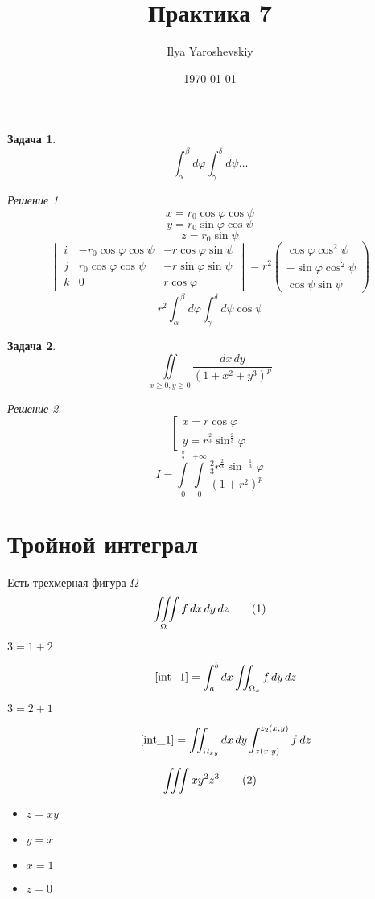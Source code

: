 \documentclass[english]{article}
\author{Ilya Yaroshevskiy}
\date{\today}
\title{Практика 7}
\newcommand\addtag{\refstepcounter{equation}\tag{\theequation}}
\theoremstyle{plain}
\theoremstyle{remark}
\newtheorem*{solution}{Решение}
\theoremstyle{definition}
\newtheorem{task}{Задача}
\begin{document}
\maketitle
\tableofcontents

\begin{task}
\[ \int_\alpha^\beta d\varphi \int_\gamma^\delta d\psi \dots \]
\end{task}
\begin{solution}
\[ x = r_0 \cos\varphi\cos\psi \]
\[ y = r_0 \sin\varphi\cos\psi \]
\[ z = r_0 \sin\psi \]
\[ \begin{vmatrix}
i & -r_0 \cos \varphi \cos \psi & - r \cos\varphi\sin\psi \\
j & r_0 \cos\varphi \cos \psi & - r\sin\varphi\sin\psi \\
k & 0 & r\cos\varphi
\end{vmatrix} = r^2 \begin{pmatrix}
\cos \varphi \cos^2 \psi \\
-\sin\varphi\cos^2\psi \\
\cos\psi\sin\psi
\end{pmatrix} \]
\[ r^2 \int^\beta_\alpha d\varphi \int_\gamma^\delta d\psi \cos\psi \]
\end{solution}

\begin{task}
\[ \iint\limits_{x\ge0,y\ge0} \frac{dx\,dy}{(1 + x^2 + y^3)^p} \]
\end{task}
\begin{solution}
\[ \left[\begin{array}{l}
x = r \cos\varphi \\
y = r^{\frac{2}{3}}\sin^{\frac{2}{3}}\varphi
\end{array}\right. \]
\[ I = \int\limits_0^{\frac{\pi}{2}}\int\limits_0^{ + \infty} \frac{\frac{2}{3} r^{\frac{2}{3}} \sin^{-\frac{1}{3}}\varphi}{(1 + r^2)^p}  \]
\end{solution}
\section{Тройной интеграл}
\label{sec:org09b7bf6}
Есть трехмерная фигура \(\Omega\)
\[ \iiint\limits_\Omega f\,dx\,dy\,dz \addtag\label{int_1} \]
\begin{description}
\item[{\(3 = 1 + 2\)}] \[ \ref{int_1} = \int_a^b dx \iint_{\Omega_x} f \,dy\,dz \]
\item[{\(3 = 2 + 1\)}] \[ \ref{int_1} = \iint_{\Omega_{xy}} dx\,dy \int_{z(x, y)}^{z_2(x, y)}f\,dz \]
\end{description}
\[ \iiint x y^2 z^3 \addtag\label{int_2} \]
\begin{itemize}
\item \(z = xy\)
\item \(y = x\)
\item \(x = 1\)
\item \(z = 0\)
\end{itemize}
\end{document}

